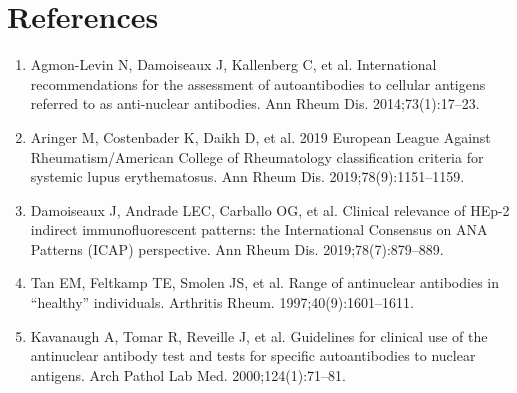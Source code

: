 \section*{References}
\begin{enumerate}
  \item Agmon-Levin N, Damoiseaux J, Kallenberg C, et al. International recommendations for the assessment of autoantibodies to cellular antigens referred to as anti-nuclear antibodies. Ann Rheum Dis. 2014;73(1):17--23.
  \item Aringer M, Costenbader K, Daikh D, et al. 2019 European League Against Rheumatism/American College of Rheumatology classification criteria for systemic lupus erythematosus. Ann Rheum Dis. 2019;78(9):1151--1159.
  \item Damoiseaux J, Andrade LEC, Carballo OG, et al. Clinical relevance of HEp-2 indirect immunofluorescent patterns: the International Consensus on ANA Patterns (ICAP) perspective. Ann Rheum Dis. 2019;78(7):879--889.
  \item Tan EM, Feltkamp TE, Smolen JS, et al. Range of antinuclear antibodies in ``healthy'' individuals. Arthritis Rheum. 1997;40(9):1601--1611.
  \item Kavanaugh A, Tomar R, Reveille J, et al. Guidelines for clinical use of the antinuclear antibody test and tests for specific autoantibodies to nuclear antigens. Arch Pathol Lab Med. 2000;124(1):71--81.
\end{enumerate}

\clearpage
